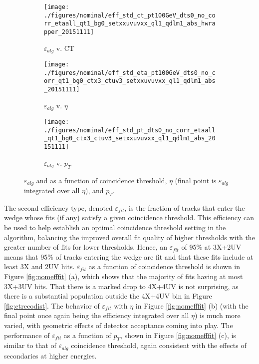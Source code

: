 \begin{figure}[!htbp]\captionsetup{justification=centering}\captionsetup{justification=centering}
  \begin{center}
\begin{subfigure}[t]{0.3\textwidth\textwidth}\centering\texttt{[image: ./figures/nominal/eff\_std\_ct\_pt100GeV\_dts0\_no\_corr\_etaall\_qt1\_bg0\_setxxuvuvxx\_ql1\_qdlm1\_abs\_hwrapper\_20151111]}\caption{$\varepsilon_{alg}$ v. CT}\end{subfigure}
\begin{subfigure}[t]{0.3\textwidth\textwidth}\centering\texttt{[image: ./figures/nominal/eff\_std\_eta\_pt100GeV\_dts0\_no\_corr\_qt1\_bg0\_ctx3\_ctuv3\_setxxuvuvxx\_ql1\_qdlm1\_abs\_20151111]}\caption{$\varepsilon_{alg}$ v. $\eta$}\end{subfigure}
\begin{subfigure}[t]{0.3\textwidth\textwidth}\centering\texttt{[image: ./figures/nominal/eff\_std\_pt\_dts0\_no\_corr\_etaall\_qt1\_bg0\_ctx3\_ctuv3\_setxxuvuvxx\_ql1\_qdlm1\_abs\_20151111]}\caption{$\varepsilon_{alg}$ v. $p_T$}\end{subfigure}
  \caption{\label{fig:nomeffalg} $\varepsilon_{alg}$ and as a function of coincidence threshold, $\eta$ (final point is $\varepsilon_{alg}$ integrated over all $\eta$), and $p_T$.}
  \end{center}
\end{figure}

The second efficiency type, denoted $\varepsilon_{fit}$, is the fraction of tracks that enter the wedge whose fits (if any) satisfy a given coincidence threshold.  This efficiency can be used to help establish an optimal coincidence threshold setting in the algorithm, balancing the improved overall fit quality of higher thresholds with the greater number of fits for lower thresholds.  Hence, an $\varepsilon_{fit}$ of 95\% at 3X+2UV means that 95\% of tracks entering the wedge are fit and that these fits include at least 3X and 2UV hits.  $\varepsilon_{fit}$ as a function of coincidence threshold is shown in Figure \ref{fig:nomefffit} (a), which shows that the majority of fits having at most 3X+3UV hits.  That there is a marked drop to 4X+4UV is not surprising, as there is a substantial population outside the 4X+4UV bin in Figure \ref{fig:ctrecodist}.  The behavior of $\varepsilon_{fit}$ with $\eta$ in Figure \ref{fig:nomefffit} (b) (with the final point once again being the efficiency integrated over all $\eta$) is much more varied, with geometric effects of detector acceptance coming into play.  The performance of $\varepsilon_{fit}$ as a function of $p_T$, shown in Figure \ref{fig:nomefffit} (c), is similar to that of $\varepsilon_{alg}$ coincidence threshold, again consistent with the effects of secondaries at higher energies.  

